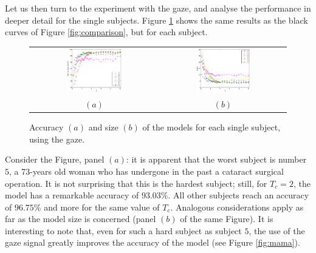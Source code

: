 \documentclass[jou,a4paper,notxfonts]{apa}
\begin{document}
Let us then turn to the experiment with the gaze, and analyse the
performance in deeper detail for the single subjects. Figure
\ref{fig:subjects} shows the same results as the black curves of Figure
\ref{fig:comparison}, but for each subject.

\begin{figure}[!ht]
  \centering
    \begin{tabular}{cc}
      \includegraphics[width=0.45\textwidth]{figs/subjects_acc.eps} &
      \includegraphics[width=0.45\textwidth]{figs/subjects_size.eps} \\
      $(a)$ & $(b)$ \\
    \end{tabular}
    \caption{Accuracy $(a)$ and size $(b)$ of the models for each single subject,
    using the gaze.}
    \label{fig:subjects}
\end{figure}

Consider the Figure, panel $(a)$: it is apparent that the worst
subject is number $5$, a 73-years old woman who has undergone in the
past a cataract surgical operation. It is not surprising that this is
the hardest subject; still, for $T_c=2$, the model has a remarkable
accuracy of $93.03\%$. All other subjects reach an accuracy of
$96.75\%$ and more for the same value of $T_c$. Analogous
considerations apply as far as the model size is concerned (panel $(b)$
of the same Figure). It is interesting to note that, even for such a
hard subject as subject $5$, the use of the gaze signal greatly
improves the accuracy of the model (see Figure \ref{fig:mama}).
\end{document}

